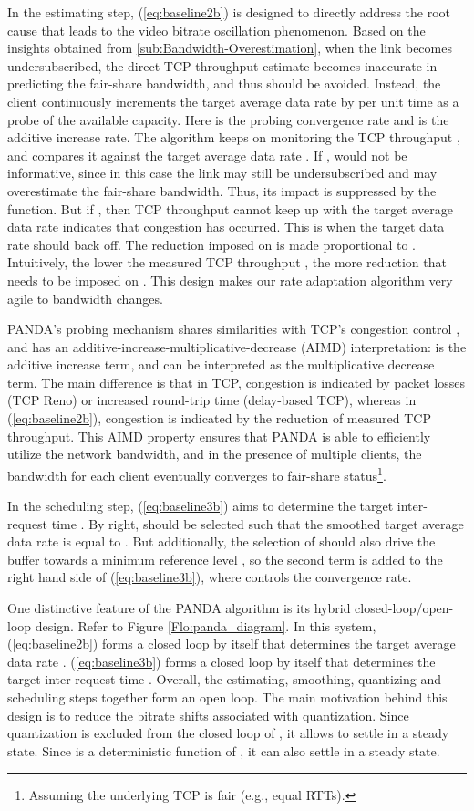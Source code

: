 \documentclass[conference]{IEEEtran}
\theoremstyle{plain}
\theoremstyle{definition}
\theoremstyle{plain}
\theoremstyle{plain}
\begin{document}
In the estimating step, (\ref{eq:baseline2b}) is designed to directly
address the root cause that leads to the video bitrate oscillation
phenomenon. Based on the insights obtained from \ref{sub:Bandwidth-Overestimation},
when the link becomes undersubscribed, the direct TCP throughput estimate
 becomes inaccurate in predicting the fair-share bandwidth,
and thus should be avoided. Instead, the client continuously increments
the target average data rate  by  per unit
time as a probe of the available capacity. Here  is the probing
convergence rate and  is the additive increase rate. The algorithm
keeps on monitoring the TCP throughput , and compares
it against the target average data rate . If ,
 would not be informative, since in this case the link
may still be undersubscribed and  may overestimate the
fair-share bandwidth. Thus, its impact is suppressed by the 
function. But if , then TCP throughput cannot
keep up with the target average data rate indicates that congestion
has occurred. This is when the target data rate  should
back off. The reduction imposed on  is made proportional
to . Intuitively, the lower the measured TCP throughput
, the more reduction that needs to be imposed on .
This design makes our rate adaptation algorithm very agile to bandwidth
changes.

PANDA's probing mechanism shares similarities with TCP's congestion
control \cite{Jacobson1988}, and has an additive-increase-multiplicative-decrease
(AIMD) interpretation:  is the additive increase term,
and  can be interpreted
as the multiplicative decrease term. The main difference is that in
TCP, congestion is indicated by packet losses (TCP Reno) or increased
round-trip time (delay-based TCP), whereas in (\ref{eq:baseline2b}),
congestion is indicated by the reduction of measured TCP throughput.
This AIMD property ensures that PANDA is able to efficiently utilize
the network bandwidth, and in the presence of multiple clients, the
bandwidth for each client eventually converges to fair-share status\footnote{Assuming the underlying TCP is fair (e.g., equal RTTs).}.

In the scheduling step, (\ref{eq:baseline3b}) aims to determine the
target inter-request time . By right,  should
be selected such that the smoothed target average data rate 
is equal to . But additionally,
the selection of  should also drive the buffer 
towards a minimum reference level , so the second term
is added to the right hand side of (\ref{eq:baseline3b}), where 
controls the convergence rate.

One distinctive feature of the PANDA algorithm is its hybrid closed-loop/open-loop
design. Refer to Figure \ref{Flo:panda_diagram}. In this system,
(\ref{eq:baseline2b}) forms a closed loop by itself that determines
the target average data rate . (\ref{eq:baseline3b}) forms
a closed loop by itself that determines the target inter-request time
. Overall, the estimating, smoothing, quantizing and scheduling
steps together form an open loop. The main motivation behind this
design is to reduce the bitrate shifts associated with quantization.
Since quantization is excluded from the closed loop of ,
it allows  to settle in a steady state. Since  is
a deterministic function of , it can also settle in a
steady state.
\end{document}
